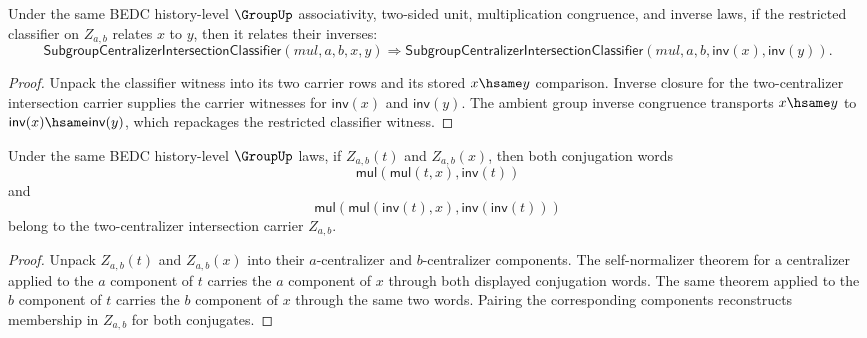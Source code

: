 \begin{theorem}
\label{thm:subgroup-centralizer-intersection-classifier-inv-closed}
Under the same BEDC history-level $\GroupUp$ associativity, two-sided unit,
multiplication congruence, and inverse laws, if the restricted classifier on
$Z_{a,b}$ relates $x$ to $y$, then it relates their inverses:
$$
\mathsf{SubgroupCentralizerIntersectionClassifier}(mul,a,b,x,y)
\Rightarrow
\mathsf{SubgroupCentralizerIntersectionClassifier}(mul,a,b,
  \mathsf{inv}(x),\mathsf{inv}(y)).
$$
\end{theorem}
\begin{proof}
Unpack the classifier witness into its two carrier rows and its stored
$x\hsame y$ comparison. Inverse closure for the two-centralizer intersection
carrier supplies the carrier witnesses for $\mathsf{inv}(x)$ and
$\mathsf{inv}(y)$. The ambient group inverse congruence transports
$x\hsame y$ to $\mathsf{inv}(x)\hsame\mathsf{inv}(y)$, which repackages the
restricted classifier witness.
\end{proof}

\begin{theorem}
\label{thm:subgroup-centralizer-intersection-self-conjugation-closure}
Under the same BEDC history-level $\GroupUp$ laws, if
$Z_{a,b}(t)$ and $Z_{a,b}(x)$, then both conjugation words
$$
\mathsf{mul}(\mathsf{mul}(t,x),\mathsf{inv}(t))
$$
and
$$
\mathsf{mul}(\mathsf{mul}(\mathsf{inv}(t),x),
  \mathsf{inv}(\mathsf{inv}(t)))
$$
belong to the two-centralizer intersection carrier $Z_{a,b}$.
\end{theorem}
\begin{proof}
Unpack $Z_{a,b}(t)$ and $Z_{a,b}(x)$ into their $a$-centralizer and
$b$-centralizer components. The self-normalizer theorem for a centralizer
applied to the $a$ component of $t$ carries the $a$ component of $x$ through
both displayed conjugation words. The same theorem applied to the $b$
component of $t$ carries the $b$ component of $x$ through the same two words.
Pairing the corresponding components reconstructs membership in
$Z_{a,b}$ for both conjugates.
\end{proof}

